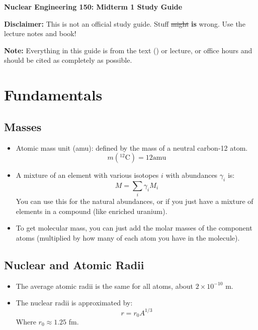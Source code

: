 \documentclass[letter]{article}
\begin{document}
\textbf{\Large{Nuclear Engineering 150: Midterm 1 Study Guide}} \\
\vspace{12pt}

\textbf{Disclaimer:} This is not an official study guide. Stuff \sout{might}
\textbf{is} wrong. Use the lecture notes and book!
\vspace{10pt}

\textbf{Note:} Everything in this guide is from the text () or
lecture, or office hours and should be cited as completely as
possible.

\tableofcontents

\section{Fundamentals}
\label{sec:fundamentals}

\subsection{Masses}
\begin{itemize}
\item Atomic mass unit (amu): defined by the mass of a neutral
  carbon-12 atom.
  \begin{equation*}
    m(^{12}\mathrm{C}) = 12 \mathrm{ amu}
  \end{equation*}
\item A mixture of an element with various isotopes $i$ with
  abundances $\gamma_i$ is:
  \begin{equation*}
    M = \sum_i\gamma_i{}M_i
  \end{equation*}
You can use this for the natural abundances, or if you just have a
mixture of elements in a compound (like enriched uranium).~\cite[Lec
3]{lecture}
\item To get molecular mass, you can just add the molar masses of the
  component atoms (multiplied by how many of each atom you have in the
  molecule).
\end{itemize}

\subsection{Nuclear and Atomic Radii}
\begin{itemize}
\item The average atomic radii is the same for all atoms, about
  $2\times{}10^{-10}$ m.~\cite[Lec 3]{lecture}
\item The nuclear radii is approximated by:
  \begin{equation*}
    r=r_0A^{1/3}
  \end{equation*}
Where $r_0 \approx 1.25$ fm.~\cite[Lec 3]{lecture}
\end{itemize}
\end{document}
